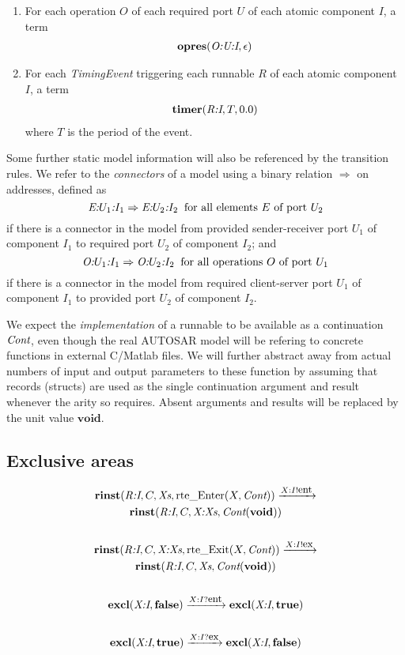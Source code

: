 \documentclass[twocolumn]{article}
\newcommand{\V}[1]{\text{\it #1}}
\newcommand{\Cont} {\V{Cont}}
\newcommand{\Xs}   {\V{Xs}}
\newcommand{\kw}[1]{\textbf{#1}}
\newcommand{\void}    {\kw{void}}
\newcommand{\true}    {\kw{true}}
\newcommand{\false}   {\kw{false}}
\newcommand{\adr}[1]{\emph{#1}}
\newcommand{\rinst}   [4]{\kw{rinst}(#1,#2,#3,#4)}
\newcommand{\excl}    [2]{\kw{excl}(#1,#2)}
\newcommand{\opres}   [2]{\kw{opres}(#1,#2)}
\newcommand{\timer}   [3]{\kw{timer}(#1,#2, #3)}
\newcommand{\rte}[1]{\text{rte\_#1}}
\newcommand{\Enter}     [2]{\rte{Enter}(#1,#2)}
\newcommand{\Exit}      [2]{\rte{Exit}(#1,#2)}
\newcommand{\red} [1]{\xrightarrow{#1}}
\newcommand{\say} [2]{#1 ! #2}
\newcommand{\hear}[2]{#1 ? #2}
\newcommand{\ent}{\text{\small ent}}
\newcommand{\ex} {\text{\small ex}}
\begin{document}
\begin{enumerate}
\item For each operation $O$ of each required port $U$ of each atomic component $I$, a term
$$
\begin{array}{c}
	\opres{\adr{O:U:I}}{\epsilon}
\end{array}
$$

\item For each \emph{TimingEvent} triggering each runnable $R$ of each atomic component $I$, a term
$$
\begin{array}{c}
	\timer{\adr{R:I}}{T}{0.0}
\end{array}
$$
where $T$ is the period of the event.

\end{enumerate}

Some further static model information will also be referenced by the transition rules. We refer to the \emph{connectors} of a model using a binary relation $\Rightarrow$ on addresses, defined as
$$
	\adr{E:$U_1$:$I_1$} \Rightarrow \adr{E:$U_2$:$I_2$} \;\;\text{for all elements $E$ of port $U_2$}
$$
if there is a connector in the model from provided sender-receiver port $U_1$ of component $I_1$ to required port $U_2$ of component $I_2$; and
$$
	\adr{O:$U_1$:$I_1$} \Rightarrow \adr{O:$U_2$:$I_2$} \;\;\text{for all operations $O$ of port $U_1$}
$$
if there is a connector in the model from required client-server port $U_1$ of component $I_1$ to provided port $U_2$ of component $I_2$.

We expect the \emph{implementation} of a runnable to be available as a continuation $\Cont$, even though the real AUTOSAR model will be refering to concrete functions in external C/Matlab files. We will further abstract away from actual numbers of input and output parameters to these function by assuming that records (structs) are used as the single continuation argument and result whenever the arity so requires. Absent arguments and results will be replaced by the unit value $\void$.

\subsection{Exclusive areas}

\begin{gather*}
	\rinst{\adr{R:I}}{C}{\Xs}{\Enter{X}{\Cont}}  \red{\say{X:I}{\ent}}  \\
		\rinst{\adr{R:I}}{C}{\adr{X:Xs}}{\Cont(\void)} \\
	\\
	\rinst{\adr{R:I}}{C}{\adr{X:Xs}}{\Exit{X}{\Cont}}  \red{\say{X:I}{\ex}}  \\
		\rinst{\adr{R:I}}{C}{\Xs}{\Cont(\void)} \\
	\\
	\excl{\adr{X:I}}{\false} \red{\hear{X:I}{\ent}} \excl{\adr{X:I}}{\true} \\
	\\
	\excl{\adr{X:I}}{\true} \red{\hear{X:I}{\ex}} \excl{\adr{X:I}}{\false} \\
	\\
\end{gather*}
\end{document}
